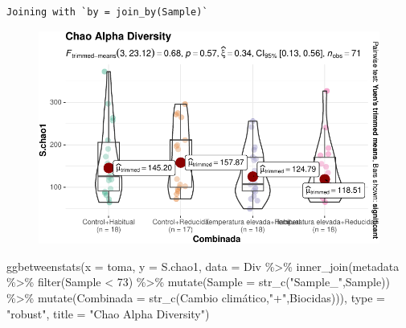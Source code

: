 \documentclass[
  letterpaper,
  DIV=11,
  numbers=noendperiod]{scrartcl}
\newenvironment{Shaded}{\begin{snugshade}}{\end{snugshade}}
\newcommand{\AttributeTok}[1]{\textcolor[rgb]{0.40,0.45,0.13}{#1}}
\newcommand{\DecValTok}[1]{\textcolor[rgb]{0.68,0.00,0.00}{#1}}
\newcommand{\FunctionTok}[1]{\textcolor[rgb]{0.28,0.35,0.67}{#1}}
\newcommand{\NormalTok}[1]{\textcolor[rgb]{0.00,0.23,0.31}{#1}}
\newcommand{\SpecialCharTok}[1]{\textcolor[rgb]{0.37,0.37,0.37}{#1}}
\newcommand{\StringTok}[1]{\textcolor[rgb]{0.13,0.47,0.30}{#1}}
\begin{document}
\begin{verbatim}
Joining with `by = join_by(Sample)`
\end{verbatim}

\begin{figure}[H]

{\centering \includegraphics{InformeNeiker_files/figure-pdf/unnamed-chunk-8-1.pdf}

}

\end{figure}

\begin{Shaded}
\begin{Highlighting}[]
\FunctionTok{ggbetweenstats}\NormalTok{(}\AttributeTok{x =}\NormalTok{ toma,}
               \AttributeTok{y =}\NormalTok{ S.chao1, }
               \AttributeTok{data =}\NormalTok{ Div }\SpecialCharTok{\%\textgreater{}\%} \FunctionTok{inner\_join}\NormalTok{(metadata }\SpecialCharTok{\%\textgreater{}\%}                                                                       \FunctionTok{filter}\NormalTok{(Sample }\SpecialCharTok{\textless{}} \DecValTok{73}\NormalTok{) }\SpecialCharTok{\%\textgreater{}\%} 
                                \FunctionTok{mutate}\NormalTok{(}\AttributeTok{Sample =} \FunctionTok{str\_c}\NormalTok{(}\StringTok{"Sample\_"}\NormalTok{,Sample)) }\SpecialCharTok{\%\textgreater{}\%} 
                                \FunctionTok{mutate}\NormalTok{(}\AttributeTok{Combinada =} \FunctionTok{str\_c}\NormalTok{(}\StringTok{\textasciigrave{}}\AttributeTok{Cambio climático}\StringTok{\textasciigrave{}}\NormalTok{,}\StringTok{"+"}\NormalTok{,Biocidas))),}
               \AttributeTok{type =} \StringTok{"robust"}\NormalTok{, }\AttributeTok{title =} \StringTok{"Chao Alpha Diversity"}\NormalTok{)}
\end{Highlighting}
\end{Shaded}
\end{document}
